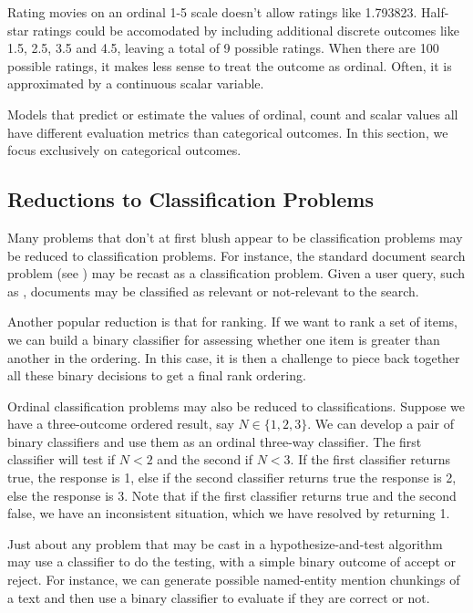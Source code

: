 Rating movies on an ordinal 1-5 scale doesn't allow ratings like
1.793823.  Half-star ratings could be accomodated by including
additional discrete outcomes like 1.5, 2.5, 3.5 and 4.5, leaving a
total of 9 possible ratings.  When there are 100 possible ratings, it
makes less sense to treat the outcome as ordinal.  Often, it is
approximated by a continuous scalar variable.

Models that predict or estimate the values of ordinal, count and
scalar values all have different evaluation metrics than categorical
outcomes.  In this section, we focus exclusively on categorical
outcomes.


\subsection{Reductions to Classification Problems}

Many problems that don't at first blush appear to be classification
problems may be reduced to classification problems.  For instance, the
standard document search problem (see ) may be recast
as a classification problem.  Given a user query, such as
, documents may be classified as
relevant or not-relevant to the search.  

Another popular reduction is that for ranking.  If we want to rank a
set of items, we can build a binary classifier for assessing whether
one item is greater than another in the ordering.  In this case, it is
then a challenge to piece back together all these binary decisions to
get a final rank ordering.

Ordinal classification problems may also be reduced to
classifications.  Suppose we have a three-outcome ordered result, say
$N \in \{ 1, 2, 3 \}$.  We can develop a pair of binary classifiers
and use them as an ordinal three-way classifier.  The first classifier
will test if $N < 2$ and the second if $N < 3$.  If the first
classifier returns true, the response is 1, else if the second
classifier returns true the response is 2, else the response is 3.
Note that if the first classifier returns true and the second false,
we have an inconsistent situation, which we have resolved by returning
1.

Just about any problem that may be cast in a hypothesize-and-test
algorithm may use a classifier to do the testing, with a simple binary
outcome of accept or reject.  For instance, we can generate possible
named-entity mention chunkings of a text and then use a binary
classifier to evaluate if they are correct or not.  

